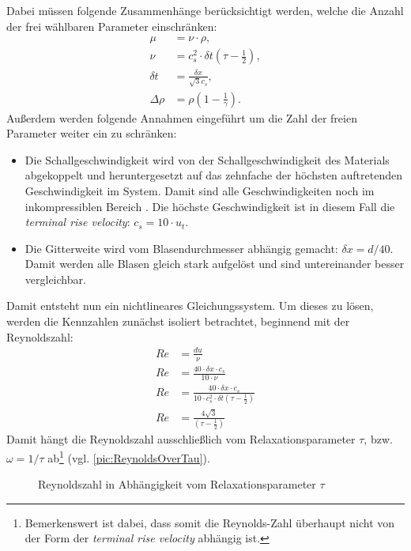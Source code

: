 \documentclass[a4paper,10pt]{scrreprt}
\begin{document}
Dabei müssen folgende Zusammenhänge berücksichtigt werden, welche die Anzahl der frei wählbaren Parameter einschränken:
\begin{align}
 \mu &= \nu \cdot \rho ,\\
 \nu &= c^2_s \cdot \delta t \left( \tau - \frac{1}{2} \right) , \\
 \delta t &= \frac{\delta x}{\sqrt{3} c_s} , \\
 \Delta \rho &= \rho \left(1 -  \frac{1}{\gamma} \right) .
\end{align}
Außerdem werden folgende Annahmen eingeführt um die Zahl der freien Parameter weiter ein zu schränken:
\begin{itemize}
 \item Die Schallgeschwindigkeit wird von der Schallgeschwindigkeit des Materials abgekoppelt und heruntergesetzt auf das zehnfache der höchsten auftretenden Geschwindigkeit im System.
       Damit sind alle Geschwindigkeiten noch im inkompressiblen Bereich \cite{Succi2001}.
       Die höchste Geschwindigkeit ist in diesem Fall die \emph{terminal rise velocity}: $c_s = 10 \cdot u_t$.
 \item Die Gitterweite wird vom Blasendurchmesser abhängig gemacht: $\delta x = d / 40$. 
       Damit werden alle Blasen gleich stark aufgelöst und sind untereinander besser vergleichbar.  
\end{itemize}
Damit entsteht nun ein nichtlineares Gleichungssystem. Um dieses zu lösen, werden die Kennzahlen zunächst isoliert betrachtet, beginnend mit der Reynoldszahl:
\begin{align}
 \mathit{Re} &= \frac{d u}{\nu} \\
 \mathit{Re} &= \frac{40 \cdot \delta x \cdot c_s}{ 10 \cdot \nu}   \\
 \mathit{Re} &= \frac{40 \cdot \delta x \cdot c_s}{ 10 \cdot c^2_s \cdot \delta t \left( \tau - \frac{1}{2} \right)} \\
 \mathit{Re} &= \frac{4 \sqrt{3}}{\left( \tau - \frac{1}{2} \right)} 
\end{align}
Damit hängt die Reynoldszahl ausschließlich vom Relaxationsparameter $\tau$, bzw. $\omega = 1/\tau$ ab\footnote{Bemerkenswert ist dabei, dass somit die Reynolds-Zahl überhaupt nicht von der Form der \emph{terminal rise velocity} abhängig ist.} (vgl. \autoref{pic:ReynoldsOverTau}).
\begin{figure}
 \centering
{}
\caption{Reynoldszahl in Abhängigkeit vom Relaxationsparameter $\tau$}
\label{pic:ReynoldsOverTau}
\end{figure} 
\end{document}
